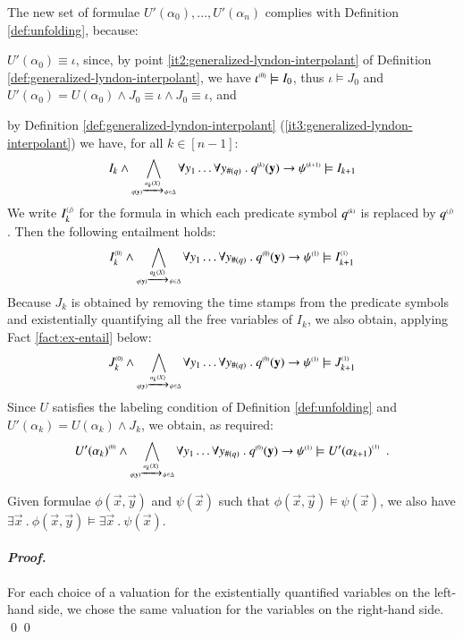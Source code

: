 The new set of formulae $U'(\alpha_0), \ldots, U'(\alpha_n)$ complies
with Definition \ref{def:unfolding}, because: \begin{compactitem}
\item $U'(\alpha_0) \equiv \iota$, since, by point
  \ref{it2:generalized-lyndon-interpolant} of Definition
  \ref{def:generalized-lyndon-interpolant}, we have ${\iota}^{\scriptscriptstyle{({0})}}
  \models I_0$, thus $\iota \models J_0$ and $U'(\alpha_0) =
  U(\alpha_0) \wedge J_0 \equiv \iota \wedge J_0 \equiv \iota$, and
\item by Definition \ref{def:generalized-lyndon-interpolant}
  (\ref{it3:generalized-lyndon-interpolant}) we have, for all $k \in
  [n-1]$:
  \[I_k \wedge \bigwedge_{\scriptscriptstyle{q(\mathbf y) \xrightarrow{{\scriptscriptstyle a_k(X)}}_{{\scriptstyle }} \psi \in \Delta}} 
  \forall y_1 \ldots \forall y_{\#(q)} ~.~ {q}^{\scriptscriptstyle{({k})}}(\mathbf y)
  \rightarrow {\psi}^{\scriptscriptstyle{({k+1})}} \models I_{k+1}\] We write
  ${I}^{\scriptscriptstyle{\langle{j}\rangle}}_k$ for the formula in which each predicate
  symbol ${q}^{\scriptscriptstyle{({k})}}$ is replaced by ${q}^{\scriptscriptstyle{({j})}}$. Then the
  following entailment holds:
  \[{I}^{\scriptscriptstyle{\langle{0}\rangle}}_k \wedge \bigwedge_{\scriptscriptstyle{q(\mathbf y) \xrightarrow{{\scriptscriptstyle a_k(X)}}_{{\scriptstyle }} \psi \in \Delta}} 
  \forall y_1 \ldots \forall y_{\#(q)} ~.~ {q}^{\scriptscriptstyle{({0})}}(\mathbf y)
  \rightarrow {\psi}^{\scriptscriptstyle{({1})}} \models {I}^{\scriptscriptstyle{\langle{1}\rangle}}_{k+1}\]
  Because $J_k$ is obtained by removing the time stamps from the predicate symbols and  
  existentially quantifying all the free variables of $I_k$, we also
  obtain, applying Fact \ref{fact:ex-entail} below:
  \[{J}^{\scriptscriptstyle{({0})}}_k \wedge \bigwedge_{\scriptscriptstyle{q(\mathbf y) \xrightarrow{{\scriptscriptstyle a_k(X)}}_{{\scriptstyle }} \psi \in \Delta}} 
  \forall y_1 \ldots \forall y_{\#(q)} ~.~ {q}^{\scriptscriptstyle{({0})}}(\mathbf y)
  \rightarrow {\psi}^{\scriptscriptstyle{({1})}} \models {J}^{\scriptscriptstyle{({1})}}_{k+1}\] Since $U$
  satisfies the labeling condition of Definition \ref{def:unfolding}
  and $U'(\alpha_k) = U(\alpha_k) \wedge J_k$, we obtain, as required:
  \[{U'(\alpha_k)}^{\scriptscriptstyle{({0})}} \wedge \bigwedge_{\scriptscriptstyle{q(\mathbf y) \xrightarrow{{\scriptscriptstyle a_k(X)}}_{{\scriptstyle }} \psi \in \Delta}} 
  \forall y_1 \ldots \forall y_{\#(q)} ~.~ {q}^{\scriptscriptstyle{({0})}}(\mathbf y)
  \rightarrow {\psi}^{\scriptscriptstyle{({1})}} \models
  {U'(\alpha_{k+1})}^{\scriptscriptstyle{({1})}}\enspace.\]
\end{compactitem}  

\begin{fact}\label{fact:ex-entail}
  Given formulae $\phi(\vec{x}, \vec{y})$ and $\psi(\vec{x})$ such
  that $\phi(\vec{x}, \vec{y}) \models \psi(\vec{x})$, we also have
  $\exists \vec{x} ~.~ \phi(\vec{x},\vec{y}) \models \exists \vec{x}
  ~.~ \psi(\vec{x})$. 
\end{fact}
\paragraph{\em Proof.} For each choice of a valuation for the existentially
quantified variables on the left-hand side, we chose the same
valuation for the variables on the right-hand side. \qed \qed

